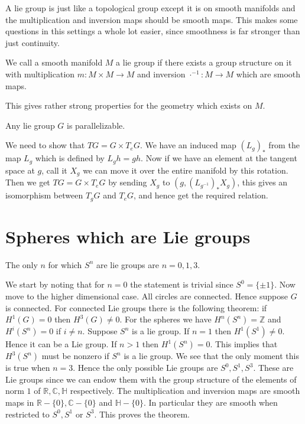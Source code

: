 \documentclass[../Thesis.tex]{subfiles}
\begin{document}
A lie group is just like a topological group except it is on smooth manifolds and the multiplication and inversion maps should be smooth maps. This makes some questions in this settings a whole lot easier, since smoothness is far stronger than just continuity.
\begin{mydef}
We call a smooth manifold $M$ a lie group if there exists a group structure on it with multiplication $m : M \times M \rightarrow M$ and inversion $\cdot^{-1}: M \rightarrow M$ which are smooth maps.
\end{mydef}
This gives rather strong properties for the geometry which exists on $M$. 
\begin{lemma}
Any lie group $G$ is parallelizable.
\end{lemma}
\begin{myproof}
We need to show that $TG = G \times T_eG$. We have an induced map $(L_g)_*$ from the map $L_g$ which is defined by $L_gh = gh$. Now if we have an element at the tangent space at $g$, call it $X_g$ we can move it over the entire manifold by this rotation. Then we get $TG = G \times T_eG$ by sending $X_g$ to $(g, (L_{g^{-1}})_*X_g)$, this gives an isomorphism between $T_gG$ and $T_eG$, and hence get the required relation.
\end{myproof}
\section{Spheres which are Lie groups}
\begin{theorem}
The only $n$ for which $S^n$ are lie groups are $n = 0,1,3$.
\end{theorem}
\begin{myproof}
We start by noting that for $n = 0$ the statement is trivial since $S^0 = \{\pm 1\}$. Now move to the higher dimensional case. All circles are connected. Hence suppose $G$ is connected.
For connected Lie groups there is the following theorem: if $H^1(G) = 0$ then $H^3(G) \neq 0$. For the spheres we have $H^n(S^n) = \mathbb{Z}$ and $H^i(S^n) = 0$ if $i \neq n$. Suppose $S^n$ is a lie group. If $n = 1$ then $H^1(S^1) \neq 0$. Hence it can be a Lie group. If $n > 1$ then $H^1(S^n) = 0$. This implies that $H^3(S^n)$ must be nonzero if $S^n$ is a lie group. We see that the only moment this is true when $n = 3$. Hence the only possible Lie groups are $S^0, S^1, S^3$. These are Lie groups since we can endow them with the group structure of the elements of norm $1$ of $\mathbb{R}, \mathbb{C}, \mathbb{H}$ respectively. The multiplication and inversion maps are smooth maps in $\mathbb{R} - \{0\}, \mathbb{C} - \{ 0 \}$ and $\mathbb{H} - \{ 0\}$. In particular they are smooth when restricted to $S^0, S^1$ or $S^3$. This proves the theorem.
\end{myproof}
\end{document}
